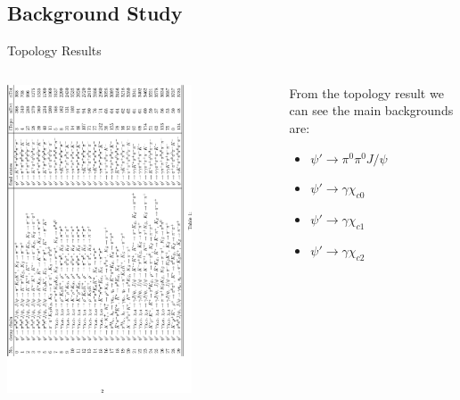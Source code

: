 \documentclass{beamer}
\begin{document}
\subsection{Background Study}
\begin{frame}{Topology Results}
\begin{columns}[c]
\begin{column}{0.7\textwidth}
\hskip -1.4cm
\includegraphics[width=0.7\textwidth,angle=270]{figures/notice_before_veto.eps}
\end{column}
\begin{column}{0.3\textwidth}
\begin{block}{}
From the topology result we can see the main backgrounds are:
\end{block}
\begin{itemize}
\item $\psi\prime\rightarrow\pi^0\pi^0J/\psi$
\item $\psi\prime\rightarrow\gamma\chi_{c0}$
\item $\psi\prime\rightarrow\gamma\chi_{c1}$
\item $\psi\prime\rightarrow\gamma\chi_{c2}$
\end{itemize}
\end{column}
\end{columns}
\end{frame}
\end{document}
